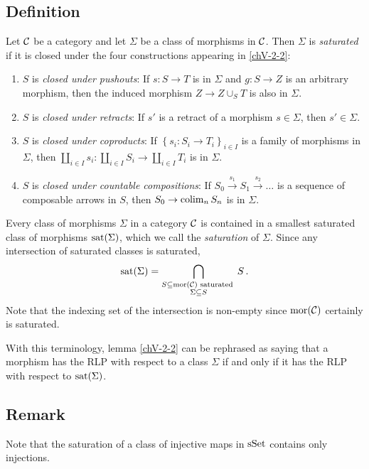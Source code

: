    \subsection{Definition}\label{chV-2-4}
        Let $\mathcal{C}$ be a category and let $\Sigma$ be a class of morphisms in $\mathcal{C}$. Then $\Sigma$ is \emph{saturated} if it is closed under the four constructions appearing in \ref{chV-2-2}:
        \begin{enumerate}[label=\roman*)]
            \item 
                $S$ is \emph{closed under pushouts}: If $s \colon S \to T$ is in $\Sigma$ and $g \colon S \to Z$ is an arbitrary morphism, then the induced morphism $Z \to Z \cup_S T$ is also in $\Sigma$.
            \item 
                $S$ is \emph{closed under retracts}: If $s'$ is a retract of a morphism $s \in \Sigma$, then $s' \in \Sigma$.
            \item 
                $S$ is \emph{closed under coproducts}: If $\left\{ s_i \colon S_i \to T_i\right\}_{i \in I}$ is a family of morphisms in $\Sigma$, then $\coprod_{i \in I}s_i \colon \coprod_{i \in I} S_i \to \coprod_{i \in I} T_i$ is in $\Sigma$.
            \item 
                $S$ is \emph{closed under countable compositions}: If $S_0 \xrightarrow{s_1} S_1 \xrightarrow{s_2} \ldots$ is a sequence of composable arrows in $S$, then $S_0 \to \operatorname*{colim}_n S_n$ is in $\Sigma$.
        \end{enumerate}

        Every class of morphisms $\Sigma$ in a category $\mathcal{C}$ is contained in a smallest saturated class of morphisms $\operatorname{sat}(\Sigma)$, which we call the \emph{saturation} of $\Sigma$. Since any intersection of saturated classes is saturated,
        \begin{equation*}
            \operatorname{sat}(\Sigma) = \bigcap_{\substack{S \subseteq \operatorname{mor}(\mathcal{C}) \text{ saturated } \\ \Sigma \subseteq S}} S \,.
        \end{equation*}
        Note that the indexing set of the intersection is non-empty since $\operatorname{mor}(\mathcal{C})$ certainly is saturated.

        With this terminology, lemma \ref{chV-2-2} can be rephrased as saying that a morphism has the RLP with respect to a class $\Sigma$ if and only if it has the RLP with respect to $\operatorname{sat}(\Sigma)$.

    \subsection{Remark}
        Note that the saturation of a class of injective maps in $\operatorname{sSet}$ contains only injections.
        \medskip

